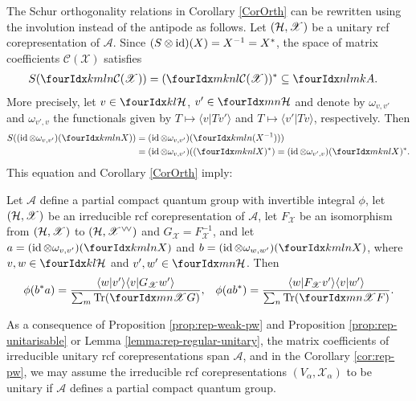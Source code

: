 The Schur orthogonality relations in Corollary \ref{CorOrth} can be
rewritten using the involution instead of the antipode as follows.
Let $(\mathcal{H},\mathscr{X})$ be a unitary rcf corepresentation of
$\mathscr{A}$. Since $(S\otimes \operatorname{id})(X)=X^{-1}=X^{*}$, the space of
matrix coefficients $\mathcal{C}(\mathscr{X})$ satisfies
\begin{align} \label{eq:rep-unitary-matrix-coefficients}
  S(\Gr{\mathcal{C}(\mathscr{X})}{k}{l}{m}{n}) &=
  (\Gr{\mathcal{C}(\mathscr{X})}{m}{n}{k}{l})^{*} \subseteq \Gr{A}{n}{m}{l}{k}.
\end{align}
More precisely, let $v \in \Gru{\Hsp}{k}{l}$, $v' \in \Gru{\Hsp}{m}{n}$
and denote by $\omega_{v,v'}$ and $\omega_{v',v}$ the functionals
given by $T \mapsto \langle v|Tv'\rangle$ and $T\mapsto \langle
v'|Tv\rangle$, respectively. Then
\begin{align*}
  S((\id \otimes \omega_{v,v'})(\Gr{X}{k}{l}{m}{n})) &=
  (\id \otimes \omega_{v,v'}) (\Gr{(X^{-1})}{k}{l}{m}{n})) \\ & =
  (\id \otimes \omega_{v,v'})( (\Gr{X}{m}{n}{k}{l})^{*}) =
  (\id \otimes \omega_{v',v})(\Gr{X}{m}{n}{k}{l})^{*}.
\end{align*}
This equation and Corollary \ref{CorOrth} imply:
\begin{Cor}\label{cor:rep-unitary-schur-orthogonality}
  Let $\mathscr{A}$ define a partial compact quantum group with
  invertible integral $\phi$, let $(\mathcal{H},\mathscr{X})$ be an irreducible
  rcf corepresentation of $\mathscr{A}$, let $F_{\mathscr{X}}$ be an
  isomorphism from $(\mathcal{H},\mathscr{X})$ to
  $(\mathcal{H},\mathscr{X}^{\vee}{}\!^{\vee})$ and
  $G_{\mathscr{X}}=F^{-1}_{{\mathscr{X}}}$, and let $a=(\id \otimes
  \omega_{v,v'})(\Gr{X}{k}{l}{m}{n})$ and $b=(\id \otimes
  \omega_{w,w'})(\Gr{X}{k}{l}{m}{n})$, where $v,w \in
  \Gru{\Hsp}{k}{l}$ and $v',w' \in \Gru{\Hsp}{m}{n}$.  Then
\begin{align*}
  \phi(b^{*}a) &= \frac{\langle w|v'\rangle\langle v|G_{\mathscr{X}}w'\rangle}{\sum_{m}
    \Tr(\Gr{G}{m}{n}{}{\mathscr{X}})}, & \phi(ab^{*}) = \frac{\langle
    w|F_{\mathscr{X}}v'\rangle \langle v|w'\rangle}{\sum_{n}
    \Tr(\Gr{F}{m}{n}{}{\mathscr{X}})}.
\end{align*}
\end{Cor}
As a consequence of Proposition \ref{prop:rep-weak-pw} and Proposition
\ref{prop:rep-unitarisable} or Lemma \ref{lemma:rep-regular-unitary},
the matrix coefficients of irreducible unitary rcf corepresentations
span $\mathscr{A}$, and in the Corollary \ref{cor:rep-pw}, we may
assume the irreducible rcf corepresentations
$(V_{\alpha},\mathscr{X}_{\alpha})$ to be unitary if $\mathscr{A}$
defines a partial compact quantum group.


